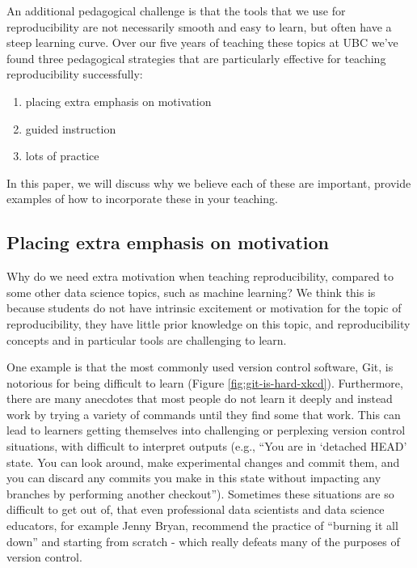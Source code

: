 \documentclass[
  12 pt,
]{paper}
\providecommand{\tightlist}{%
  \setlength{\itemsep}{0pt}\setlength{\parskip}{0pt}}
\begin{document}
An additional pedagogical challenge
is that the tools that we use for reproducibility
are not necessarily smooth and easy to learn,
but often have a steep learning curve.
Over our five years of teaching these topics at UBC
we've found three pedagogical strategies
that are particularly effective for teaching reproducibility successfully:

\begin{enumerate}
\def\labelenumi{\arabic{enumi}.}
\tightlist
\item
  placing extra emphasis on motivation
\item
  guided instruction
\item
  lots of practice
\end{enumerate}

In this paper, we will discuss why we believe each of these are important,
provide examples of how to incorporate these in your teaching.

\hypertarget{placing-extra-emphasis-on-motivation}{%
\subsection{Placing extra emphasis on motivation}\label{placing-extra-emphasis-on-motivation}}

Why do we need extra motivation when teaching reproducibility,
compared to some other data science topics, such as machine learning?
We think this is because students do not have intrinsic excitement
or motivation for the topic of reproducibility,
they have little prior knowledge on this topic,
and reproducibility concepts and in particular tools are challenging to learn.

One example is that the most commonly used version control software, Git,
is notorious for being difficult to learn (Figure \ref{fig:git-is-hard-xkcd}).
Furthermore, there are many anecdotes that most people
do not learn it deeply
and instead work by trying a variety of commands until they find some
that work. This can lead to learners getting themselves into challenging or
perplexing version control situations, with difficult to interpret outputs
(e.g., ``You are in `detached HEAD' state. You can look around, make experimental changes and commit them, and you can discard any commits you make in this state without impacting any branches by performing another checkout'').
Sometimes these situations are so difficult to get out of, that even professional
data scientists and data science educators, for example Jenny Bryan,
recommend the practice of ``burning it all down'' and starting from scratch -
which really defeats many of the purposes of version control.
\end{document}

